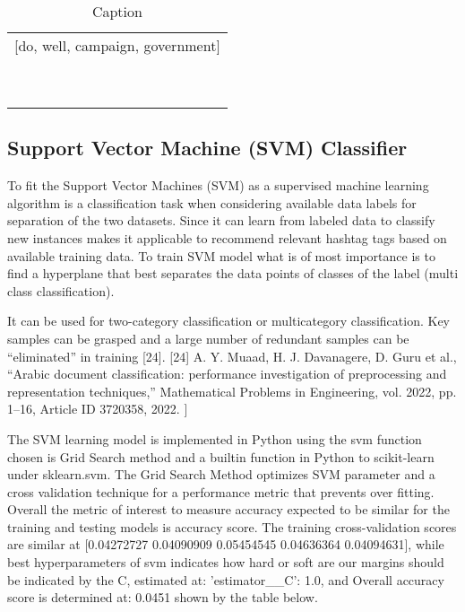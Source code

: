 \begin{table}
    \centering
    \begin{tabular}{c}
        [do, well, campaign, government]\\
        [employer]\\
        [know]\\
        [say]\\
        [act, address, cigarette]\\
        []\\
        [watch, budget,bill,finance,return]\\
        [cigarette, trade]\\
        [do,cigarette,trade,well, illicit]\\
        [team, know, most,sell,assessment]\\
    \end{tabular}
    \caption{Caption}
    \label{tab:my_label}
\end{table}

\subsection{Support Vector Machine (SVM) Classifier}
 
To fit the Support Vector Machines (SVM) as a supervised machine learning algorithm is a classification task when considering available data labels for separation of the two datasets. Since it can learn from labeled data to classify new instances makes it applicable to recommend relevant hashtag tags based on available training data.  To train SVM model what is of most importance is to find  a hyperplane that best separates the data points of classes of the label (multi class classification).

It can be used for two-category classification or multicategory
classification. Key samples can be grasped and a
large number of redundant samples can be “eliminated”
in training [24].  [24] A. Y. Muaad, H. J. Davanagere, D. Guru et al., “Arabic document classification: performance investigation of preprocessing and representation techniques,” Mathematical Problems in Engineering, vol. 2022, pp. 1–16, Article ID 3720358, 2022. ]

The SVM learning model is implemented in Python using the svm function chosen is Grid Search method and a builtin function in Python to scikit-learn under sklearn.svm.  The Grid Search Method optimizes SVM parameter and a cross validation technique for a performance metric that prevents over fitting.  Overall the metric of interest to measure accuracy expected to be similar for the training and testing models is accuracy score.  
The training cross-validation scores are similar at [0.04272727 0.04090909 0.05454545 0.04636364 0.04094631],  while best hyperparameters of svm indicates how hard or soft are our margins should be indicated by the C, estimated at: {'estimator__C': 1.0}, and Overall accuracy score is determined at: 0.0451 shown by the table below.

